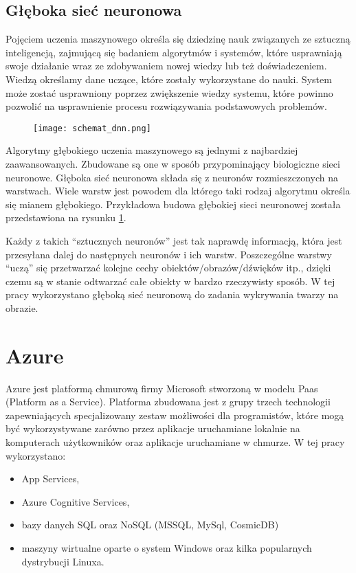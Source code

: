 \subsection{Głęboka sieć neuronowa} \label{dnn}
Pojęciem uczenia maszynowego określa się dziedzinę nauk związanych ze sztuczną inteligencją, zajmującą się badaniem algorytmów i systemów, które usprawniają swoje działanie wraz ze zdobywaniem nowej wiedzy lub też doświadczeniem. Wiedzą określamy dane uczące, które zostały wykorzystane do nauki. System może zostać usprawniony poprzez zwiększenie wiedzy systemu, które powinno pozwolić na usprawnienie procesu rozwiązywania podstawowych problemów.
\begin{figure}[H]
	\centering
	\texttt{[image: schemat\_dnn.png]}
	\label{fig:budowa_dnn}
\end{figure}
Algorytmy głębokiego uczenia maszynowego są jednymi z najbardziej zaawansowanych. Zbudowane są one w sposób przypominający biologiczne sieci neuronowe. Głęboka sieć neuronowa składa się z neuronów rozmieszczonych na warstwach. Wiele warstw jest powodem dla którego taki rodzaj algorytmu określa się mianem głębokiego. Przykładowa budowa głębokiej sieci neuronowej została przedstawiona na rysunku \ref{fig:budowa_dnn}.

Każdy z takich “sztucznych neuronów” jest tak naprawdę informacją, która jest przesyłana dalej do następnych neuronów i ich warstw. Poszczególne warstwy “uczą” się przetwarzać kolejne cechy obiektów/obrazów/dźwięków itp., dzięki czemu są w stanie odtwarzać całe obiekty w bardzo rzeczywisty sposób. W tej pracy wykorzystano głęboką sieć neuronową do zadania wykrywania twarzy na obrazie.

\section{Azure} \label{azure}
Azure jest platformą chmurową firmy Microsoft stworzoną w modelu Paas (Platform as a Service). Platforma zbudowana jest z grupy trzech technologii zapewniających specjalizowany zestaw możliwości dla programistów, które mogą być wykorzystywane zarówno przez aplikacje uruchamiane lokalnie na komputerach użytkowników oraz aplikacje uruchamiane w chmurze. W tej pracy wykorzystano:
\begin{itemize}
    \item App Services,
    \item Azure Cognitive Services,
    \item bazy danych SQL oraz NoSQL (MSSQL, MySql, CosmicDB)
    \item maszyny wirtualne oparte o system Windows oraz kilka popularnych dystrybucji Linuxa.
\end{itemize}
